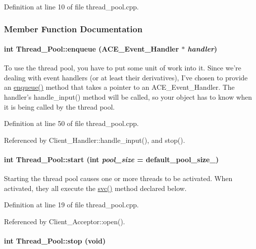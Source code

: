 Definition at line 10 of file thread\_\-pool.cpp.

\subsubsection{Member Function Documentation}
\hypertarget{classThread__Pool_Thread__Poola3}{
\paragraph[enqueue]{\setlength{\rightskip}{0pt plus 5cm}int Thread\_\-Pool::enqueue (ACE\_\-Event\_\-Handler $\ast$ {\em handler})}\hfill}
\label{classThread__Pool_Thread__Poola3}


To use the thread pool, you have to put some unit of work into it. Since we're dealing with event handlers (or at least their derivatives), I've chosen to provide an \hyperlink{classThread__Pool_Thread__Poola3}{enqueue()} method that takes a pointer to an ACE\_\-Event\_\-Handler. The handler's handle\_\-input() method will be called, so your object has to know when it is being called by the thread pool. 

Definition at line 50 of file thread\_\-pool.cpp.

Referenced by Client\_\-Handler::handle\_\-input(), and stop().\hypertarget{classThread__Pool_Thread__Poola1}{
\paragraph[start]{\setlength{\rightskip}{0pt plus 5cm}int Thread\_\-Pool::start (int {\em pool\_\-size} = default\_\-pool\_\-size\_\-)}\hfill}
\label{classThread__Pool_Thread__Poola1}


Starting the thread pool causes one or more threads to be activated. When activated, they all execute the \hyperlink{classThread__Pool_Thread__Poolb0}{svc()} method declared below. 

Definition at line 19 of file thread\_\-pool.cpp.

Referenced by Client\_\-Acceptor::open().\hypertarget{classThread__Pool_Thread__Poola2}{
\paragraph[stop]{\setlength{\rightskip}{0pt plus 5cm}int Thread\_\-Pool::stop (void)}\hfill}
\label{classThread__Pool_Thread__Poola2}




